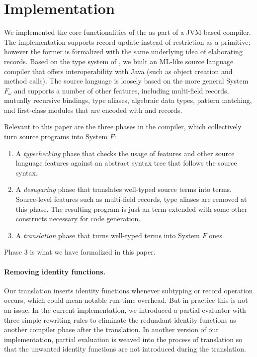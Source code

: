\section{Implementation}

We implemented the core functionalities of the \name as part of a JVM-based
compiler. The implementation supports record update instead of restriction as a
primitive; however the former is formalized with the same underlying idea of
elaborating records. Based on the type system of \name, we built an ML-like
source language compiler that offers interoperability with Java (such as object
creation and method calls). The source language is loosely based on the more
general System $F_{\omega}$ and supports a
number of other features, including multi-field records, mutually recursive
 bindings, type aliases, algebraic data types, pattern matching, and
first-class modules that are encoded with  and records.

Relevant to this paper are the three phases in the compiler, which 
collectively turn source programs into System $F$:

\begin{enumerate}
\item A \emph{typechecking} phase that checks the usage of \name features and
  other source language features against an abstract syntax tree that follows
  the source syntax.

\item A \emph{desugaring} phase that translates well-typed source terms into
  \name terms. Source-level features such as multi-field records, type aliases
  are removed at this phase. The resulting program is just an \name term
  extended with some other constructs necessary for code generation.

\item A \emph{translation} phase that turns well-typed \name terms into System
  $F$ ones.
\end{enumerate}

Phase 3 is what we have formalized in this paper.

\paragraph{Removing identity functions.} Our translation inserts identity
functions whenever subtyping or record operation occurs, which could mean
notable run-time overhead. But in practice this is not an issue. In the current
implementation, we introduced a partial evaluator with three simple rewriting
rules to eliminate the redundant identity functions as another compiler phase
after the translation. In another version of our implementation, partial
evaluation is weaved into the process of translation so that the unwanted
identity functions are not introduced during the translation.

